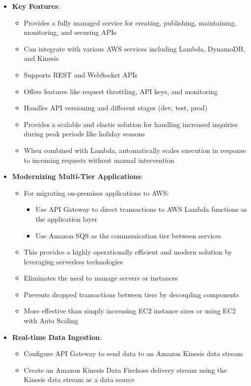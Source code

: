 \documentclass[11pt,a4paper]{report}
\begin{document}
\begin{itemize}
  \item \textbf{Key Features}:
\begin{itemize}
  \item Provides a fully managed service for creating, publishing, maintaining, monitoring, and securing APIs
  \item Can integrate with various AWS services including Lambda, DynamoDB, and Kinesis
  \item Supports REST and WebSocket APIs
  \item Offers features like request throttling, API keys, and monitoring
  \item Handles API versioning and different stages (dev, test, prod)
  \item Provides a scalable and elastic solution for handling increased inquiries during peak periods like holiday seasons
  \item When combined with Lambda, automatically scales execution in response to incoming requests without manual intervention
\end{itemize}
  \item \textbf{Modernizing Multi-Tier Applications}:
\begin{itemize}
  \item For migrating on-premises applications to AWS:
\begin{itemize}
  \item Use API Gateway to direct transactions to AWS Lambda functions as the application layer
  \item Use Amazon SQS as the communication tier between services
\end{itemize}
  \item This provides a highly operationally efficient and modern solution by leveraging serverless technologies
  \item Eliminates the need to manage servers or instances
  \item Prevents dropped transactions between tiers by decoupling components
  \item More effective than simply increasing EC2 instance sizes or using EC2 with Auto Scaling
\end{itemize}
  \item \textbf{Real-time Data Ingestion}:
\begin{itemize}
  \item Configure API Gateway to send data to an Amazon Kinesis data stream
  \item Create an Amazon Kinesis Data Firehose delivery stream using the Kinesis data stream as a data source

\end{itemize}
\end{itemize}
\end{document}
